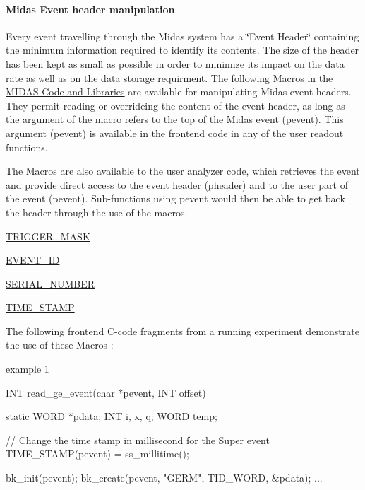 \par
 

 \par
\hypertarget{FE_bank_construction_FE_Midas_Event_Header_Manipulation}{}\paragraph{Midas Event header manipulation}\label{FE_bank_construction_FE_Midas_Event_Header_Manipulation}
\label{FE_bank_construction_FE_Midas_Event_Header_Macros}
\hypertarget{FE_bank_construction_FE_Midas_Event_Header_Macros}{}
 Every event travelling through the Midas system has a \char`\"{}Event Header\char`\"{} containing the minimum information required to identify its contents. The size of the header has been kept as small as possible in order to minimize its impact on the data rate as well as on the data storage requirment. The following Macros in the \hyperlink{F_Midas_Code_and_Libraries_F_Midas_Library}{MIDAS Code and Libraries} are available for manipulating Midas event headers. They permit reading or overrideing the content of the event header, as long as the argument of the macro refers to the top of the Midas event (pevent). This argument (pevent) is available in the frontend code in any of the user readout functions.

The Macros are also available to the user analyzer code, which retrieves the event and provide direct access to the event header (pheader) and to the user part of the event (pevent). Sub-\/functions using pevent would then be able to get back the header through the use of the macros.


\begin{DoxyItemize}
\item \hyperlink{group__mbufferh_ga6a0d6be5b8aad5a907d5b880bae93eb9}{TRIGGER\_\-MASK}
\item \hyperlink{group__mbufferh_gaf42c9a1ac33cf459bfd366673f6a4d70}{EVENT\_\-ID}
\item \hyperlink{group__mbufferh_gadbb75a9d81e264e357bc5fc73dd4ebb8}{SERIAL\_\-NUMBER}
\item \hyperlink{group__mbufferh_gae8d2f03c283637c81cdcfd3fda065d53}{TIME\_\-STAMP}
\end{DoxyItemize}

\label{FE_bank_construction_timestamp}
\hypertarget{FE_bank_construction_timestamp}{}
 The following frontend C-\/code fragments from a running experiment demonstrate the use of these Macros :
\begin{DoxyItemize}
\item example 1 
\begin{DoxyCode}
INT read_ge_event(char *pevent, INT offset)
{
  static WORD *pdata;
  INT i, x, q;
  WORD temp;
 
  // Change the time stamp in millisecond for the Super event
  TIME_STAMP(pevent) = ss_millitime();
  
  bk_init(pevent);
  bk_create(pevent, "GERM", TID_WORD, &pdata);
  ...
}
\end{DoxyCode}

\end{DoxyItemize}


